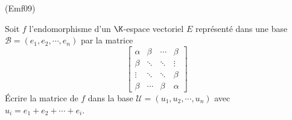 \begin{tiny}(Emf09)\end{tiny}
Soit $f$ l'endomorphisme d'un $\K$-espace vectoriel $E$ repr{\'e}sent{\'e} dans une base $\mathcal{B}=(e_{1},e_{2},\cdots ,e_{n})$ par la matrice
\[
\left[
\begin{array}{cccc}
\alpha & \beta & \cdots & \beta \\
\beta & \ddots & \ddots & \vdots \\
\vdots & \ddots & \ddots & \beta \\
\beta & \cdots & \beta & \alpha
\end{array}
\right]
\]
\'Ecrire la matrice de $f$ dans la base $\mathcal{U}=(u_{1},u_{2},\cdots ,u_{n})$ avec $u_{i}=e_{1} + e_{2} + \cdots + e_{i}$.
